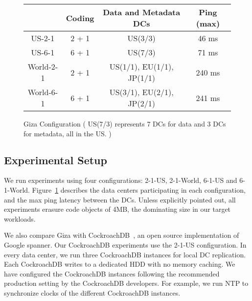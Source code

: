 \begin{figure}
\footnotesize
\centering
\begin{tabular}{c|c|c|c}
          & Coding & Data and Metadata DCs & Ping (max)\\
\hline
US-2-1 	  & 2 + 1 & US(3/3)                   & 46 ms \\
US-6-1 	  & 6 + 1 & US(7/3)                   & 71 ms\\ 
World-2-1 & 2 + 1 & US(1/1), EU(1/1), JP(1/1) & 240 ms\\
World-6-1 & 6 + 1 & US(3/1), EU(2/1), JP(2/1) & 241 ms\\
\end{tabular}
\caption{Giza Configuration ( US(7/3) represents 7 DCs for data and 3 DCs for metadata, all in the US. )} 
\label{fig:dcconfig} 
\end{figure}

\subsection{Experimental Setup}
We run experiments using four configurations: 2-1-US, 2-1-World, 6-1-US and 6-1-World. Figure~\ref{fig:dcconfig} describes the data centers participating in each configuration, and the max ping latency between the DCs. Unless explicitly pointed out, all experiments erasure code objects of 4MB, the dominating size in our target workloads.

We also compare Giza with CockroachDB~\cite{cockroachdb}, an open source implementation of Google spanner. Our CockroachDB experiments use the 2-1-US configuration. In every data center, we run three CockroachDB instances for local DC replication. Each CockroachDB writes to a dedicated HDD with no memory caching. We have configured the CockroachDB instances following the recommended production setting by the CockroachDB developers. For example, we run NTP to synchronize clocks of the different CockroachDB instances.


